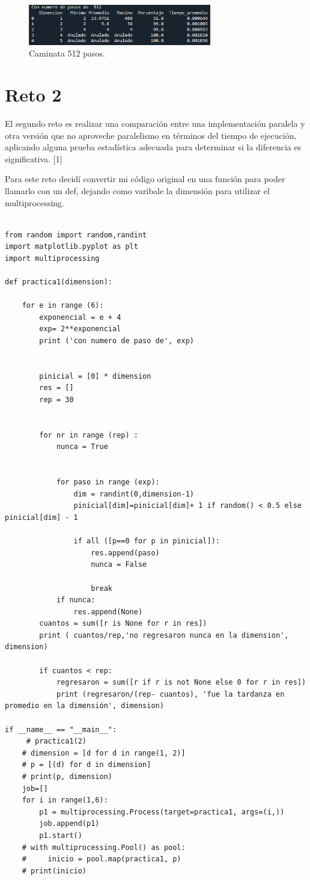 \documentclass{article}
\begin{document}
\begin{figure}[H]
\centering
\includegraphics[width=80mm]{tiempo_pasos512.png}
\caption{\label{fig1}Caminata 512 pasos.}
\end{figure}


\section{Reto 2}
El segundo reto es realizar una comparación entre una implementación paralela y otra versión que no aproveche paralelismo en términos del tiempo de ejecución, aplicando alguna prueba estadística adecuada para determinar si la diferencia es significativa. [1]

Para este reto decidí convertir mi código original en una función para poder llamarlo con un def, dejando como varibale la dimensión para utilizar el multiprocessing.

\begin{verbatim}

from random import random,randint
import matplotlib.pyplot as plt
import multiprocessing

def practica1(dimension):

    for e in range (6):
        exponencial = e + 4
        exp= 2**exponencial
        print ('con numero de paso de', exp)
     
        
        pinicial = [0] * dimension
        res = []
        rep = 30
        
        
        for nr in range (rep) :
            nunca = True 
            
            
            for paso in range (exp):
                dim = randint(0,dimension-1)
                pinicial[dim]=pinicial[dim]+ 1 if random() < 0.5 else pinicial[dim] - 1
                
                if all ([p==0 for p in pinicial]):
                    res.append(paso)
                    nunca = False
                    
                    break
            if nunca:
                res.append(None)
        cuantos = sum([r is None for r in res])
        print ( cuantos/rep,'no regresaron nunca en la dimension', dimension)
        
        if cuantos < rep:
            regresaron = sum([r if r is not None else 0 for r in res])
            print (regresaron/(rep- cuantos), 'fue la tardanza en promedio en la dimensión', dimension)
            
if __name__ == "__main__":
     # practica1(2)
    # dimension = [d for d in range(1, 2)]
    # p = [(d) for d in dimension]
    # print(p, dimension)
    job=[]
    for i in range(1,6):
        p1 = multiprocessing.Process(target=practica1, args=(i,))
        job.append(p1)
        p1.start()
    # with multiprocessing.Pool() as pool:
    #     inicio = pool.map(practica1, p)
    # print(inicio)
   
\end{verbatim}
\end{document}
